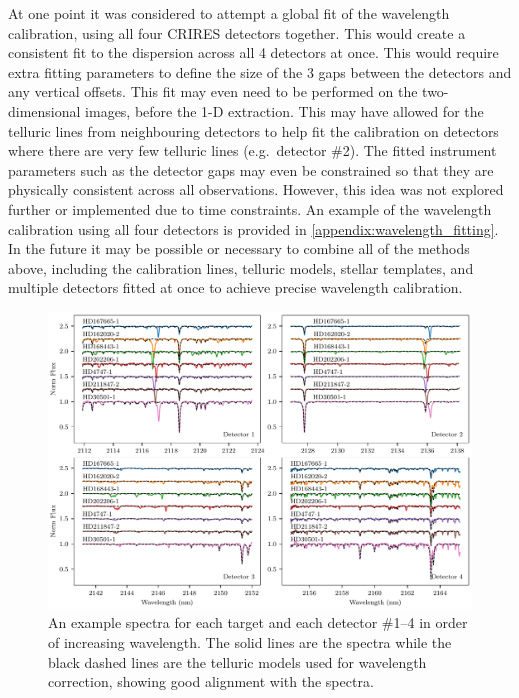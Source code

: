 At one point it was considered to attempt a global fit of the wavelength calibration, using all four {CRIRES} detectors together.
This would create a consistent fit to the dispersion across all 4 detectors at once.
This would require extra fitting parameters to define the size of the 3 gaps between the detectors and any vertical offsets.
This fit may even need to be performed on the two-dimensional images, before the 1-D extraction.
This may have allowed for the telluric lines from neighbouring detectors to help fit the calibration on detectors where there are very few telluric lines (e.g.\ detector \#2).
The fitted instrument parameters such as the detector gaps may even be constrained so that they are physically consistent across all observations.
However, this idea was not explored further or implemented due to time constraints.
An example of the wavelength calibration using all four detectors is provided in \cref{appendix:wavelength_fitting}.
In the future it may be possible or necessary to combine all of the methods above, including the \thar{} calibration lines, telluric models, stellar templates, and multiple detectors fitted at once to achieve precise wavelength calibration.

\begin{figure}
    \centering
    \includegraphics[width=1\linewidth]{figures/reduction/Spectra_examples}
    \caption[Example reduced CRIRES spectra for each target.]{An example spectra for each target and each detector \#1--4 in order of increasing wavelength.
       The solid lines are the spectra while the black dashed lines are the telluric models used for wavelength correction, showing good alignment with the spectra.}
    \label{fig:spectraexamples}
\end{figure}

